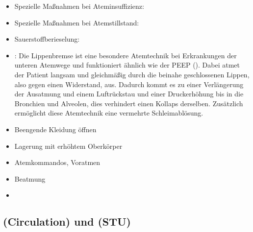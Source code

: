 
{%
\begin{itemize}
  \item Spezielle Maßnahmen bei Ateminsuffizienz:
  \item Spezielle Maßnahmen bei Atemstillstand: 
  \item Sauerstoffberieselung: 
  \item {}: 
  \label{topic:lippenbremse-basic}
  Die Lippenbremse ist eine besondere Atemtechnik bei Erkrankungen der unteren Atemwege 
  und funktioniert ähnlich wie der PEEP (). 
  Dabei atmet der Patient langsam und gleichmäßig durch die beinahe geschlossenen Lippen, also gegen einen Widerstand, aus. 
  Dadurch kommt es zu einer Verlängerung der Ausatmung 
  und einem Luftrückstau 
  und einer Druckerhöhung bis in die Bronchien und Alveolen, 
  dies verhindert einen Kollaps derselben.
  Zusätzlich ermöglicht diese Atemtechnik eine vermehrte Schleimablösung.
  \item Beengende Kleidung öffnen
  \item Lagerung mit erhöhtem Oberkörper
  \item Atemkommandos, Voratmen
  \item Beatmung
  \item \TxMassVit
\end{itemize}
}


\clearpage
\subsection{{} 
(Circulation) und  (STU)}

\label{topic:kreislauf}
\label{topic:circulation}







